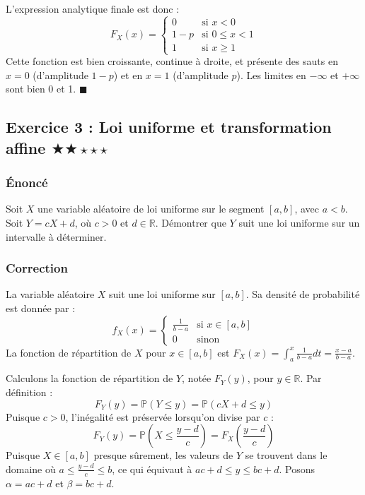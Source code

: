 \documentclass[11pt,a4paper]{article}
\begin{document}
L'expression analytique finale est donc :
$$ F_X(x) = \begin{cases} 0 & \text{si } x < 0 \\ 1 - p & \text{si } 0 \leq x < 1 \\ 1 & \text{si } x \geq 1 \end{cases} $$
Cette fonction est bien croissante, continue à droite, et présente des sauts en $x=0$ (d'amplitude $1-p$) et en $x=1$ (d'amplitude $p$). Les limites en $-\infty$ et $+\infty$ sont bien 0 et 1. $\blacksquare$


\subsection*{Exercice 3 : Loi uniforme et transformation affine \quad $\bigstar\bigstar\star\star\star$}

\subsubsection*{Énoncé}

Soit $X$ une variable aléatoire de loi uniforme sur le segment $[a, b]$, avec $a < b$.
Soit $Y = cX + d$, où $c > 0$ et $d \in \mathbb{R}$.
Démontrer que $Y$ suit une loi uniforme sur un intervalle à déterminer.

\subsubsection*{Correction}

La variable aléatoire $X$ suit une loi uniforme sur $[a, b]$. Sa densité de probabilité est donnée par :
$$ f_X(x) = \begin{cases} \frac{1}{b - a} & \text{si } x \in [a, b] \\ 0 & \text{sinon} \end{cases} $$
La fonction de répartition de $X$ pour $x \in [a,b]$ est $F_X(x) = \int_a^x \frac{1}{b-a} dt = \frac{x-a}{b-a}$.

Calculons la fonction de répartition de $Y$, notée $F_Y(y)$, pour $y \in \mathbb{R}$.
Par définition :
$$ F_Y(y) = \mathbb{P}(Y \leq y) = \mathbb{P}(cX + d \leq y) $$
Puisque $c > 0$, l'inégalité est préservée lorsqu'on divise par $c$ :
$$ F_Y(y) = \mathbb{P}\left(X \leq \frac{y - d}{c}\right) = F_X\left(\frac{y - d}{c}\right) $$
Puisque $X \in [a, b]$ presque sûrement, les valeurs de $Y$ se trouvent dans le domaine où $a \leq \frac{y-d}{c} \leq b$, ce qui équivaut à $ac+d \leq y \leq bc+d$. Posons $\alpha = ac+d$ et $\beta = bc+d$.
\end{document}
